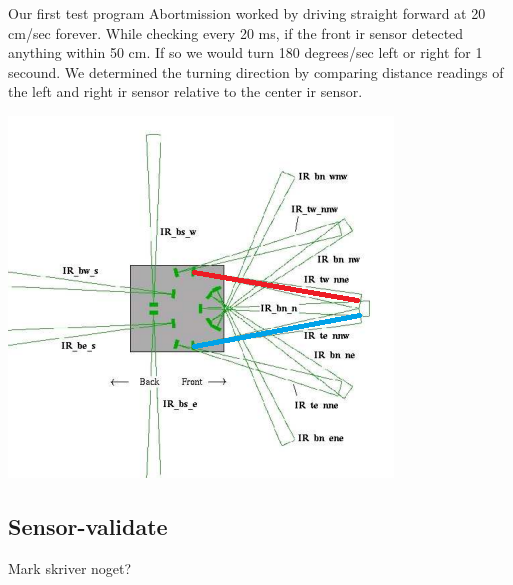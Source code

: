 \documentclass[a4paper,12pt]{article}
\begin{document}
Our first test program Abortmission worked by driving straight forward at 20 cm/sec forever. While checking every 20 ms, if the front ir sensor detected anything within 50 cm. If so we would turn 180 degrees/sec left or right for 1 secound. We determined the turning direction by comparing distance readings of the left and right ir sensor relative to the center ir sensor.

\includegraphics{robot2.png}

\subsection{Sensor-validate}

Mark skriver noget?
\end{document}
